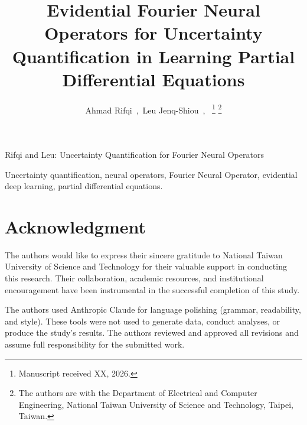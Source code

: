 \documentclass[journal]{IEEEtran}
\begin{document}
\title{Evidential Fourier Neural Operators for Uncertainty Quantification in Learning Partial Differential Equations}

\author{Ahmad Rifqi~,~Leu Jenq-Shiou~,~
\thanks{Manuscript received XX, 2026.}
\thanks{The authors are with the Department of Electrical and Computer Engineering, National Taiwan University of Science and Technology, Taipei, Taiwan.}}

%
{Rifqi and Leu: Uncertainty Quantification for Fourier Neural Operators}

\maketitle



\begin{IEEEkeywords}
Uncertainty quantification, neural operators, Fourier Neural Operator, evidential deep learning, partial differential equations.
\end{IEEEkeywords}

\IEEEpeerreviewmaketitle


\section*{Acknowledgment}
The authors would like to express their sincere gratitude to National Taiwan University of Science and Technology for
their valuable support in conducting this research. Their collaboration, academic resources, and institutional
encouragement have been instrumental in the successful completion of this study.

The authors used Anthropic Claude for language polishing (grammar, readability, and style). These tools were not
used to generate data, conduct analyses, or produce the study's results. The authors reviewed and approved all
revisions and assume full responsibility for the submitted work.
\end{document}

